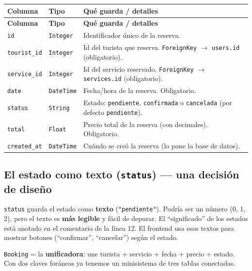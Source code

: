 \documentclass[11pt,a4paper]{article}
\begin{document}
\begin{center}
{\small
\setlength{\tabcolsep}{4pt}
\begin{longtable}{@{}>{\raggedright\arraybackslash}p{3.4cm}>{\raggedright\arraybackslash}p{3cm}>{\raggedright\arraybackslash}p{8.5cm}@{}}
\toprule
\textbf{Columna} & \textbf{Tipo} & \textbf{Qué guarda / detalles} \\
\midrule
\endfirsthead
\toprule
\textbf{Columna} & \textbf{Tipo} & \textbf{Qué guarda / detalles} \\
\midrule
\endhead
\texttt{id} & \texttt{Integer} & Identificador único de la reserva. \\
\texttt{tourist\_id} & \texttt{Integer} & Id del turista que reserva. \texttt{ForeignKey} $\rightarrow$ \texttt{users.id} (obligatorio). \\
\texttt{service\_id} & \texttt{Integer} & Id del servicio reservado. \texttt{ForeignKey} $\rightarrow$ \texttt{services.id} (obligatorio). \\
\texttt{date} & \texttt{DateTime} & Fecha/hora de la reserva. Obligatorio. \\
\texttt{status} & \texttt{String} & Estado: \texttt{pendiente}, \texttt{confirmada} o \texttt{cancelada} (por defecto \texttt{pendiente}). \\
\texttt{total} & \texttt{Float} & Precio total de la reserva (con decimales). Obligatorio. \\
\texttt{created\_at} & \texttt{DateTime} & Cuándo se creó la reserva (lo pone la base de datos). \\
\bottomrule
\end{longtable}
}
\end{center}

\subsection{El estado como texto (\texttt{status}) --- una decisión de diseño}

\texttt{status} guarda el estado como \textbf{texto} (\texttt{"pendiente"}). Podría ser un número
(0, 1, 2), pero el texto es \textbf{más legible} y fácil de depurar. El ``significado'' de los
estados está anotado en el comentario de la línea 12. El frontend usa esos textos para
mostrar botones (``confirmar'', ``cancelar'') según el estado.

\begin{recuadro}
\texttt{Booking} = la \textbf{unificadora}: une turista + servicio + fecha + precio + estado.
Con dos claves foráneas ya tenemos un minisistema de tres tablas conectadas.
\end{recuadro}
\end{document}
